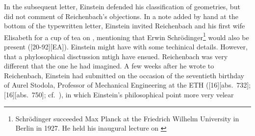 \documentclass[draft]{article}
\newcommand{\vbein}{vierbein\xspace}
\begin{document}

In the subsequent letter, Einstein defended his classification of geometries, but did not comment of Reichenbach's objections. In a note added by hand at the bottom of the typewritten letter, Einstein invited Reichenbach and his first wife Elisabeth for a cup of tea on , mentioning that Erwin Schrödinger\footnote{Schrödinger succeeded Max Planck at the Friedrich Wilhelm University in Berlin in 1927. He held his inaugural lecture on  \citep{Schroedinger1929a}} would also be present ([20-92][EA]). Einstein might have with some techinical details. However, that a phylosophical disctussion mtigh have ensued. Reichenbach was very different that the one he had imagined. A few weeks after he wrote to Reichenbach, Einstein had submitted  on the occasion of the seventieth birthday of Aurel Stodola\label{stodola}, Professor of Mechanical Engineering at the ETH ([16][abs.\ 732]; [16][abs.\ 750]; cf.\ \cite{Einstein1929d}), in which Einstein's philosophical point more very velear






\end{document}
